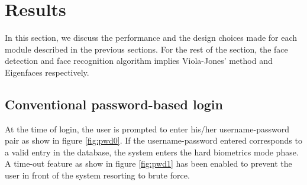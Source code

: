 \documentclass[12pt]{article}			%
\begin{document}
\newpage
\section{ Results }

In this section, we discuss the performance and the design choices made for each module described in the previous sections.
For the rest of the section, the face detection and face recognition algorithm implies Viola-Jones' method and Eigenfaces respectively.

\subsection{Conventional password-based login}
\begin{figure}
	\centering
	\quad
\end{figure}

At the time of login, the user is prompted to enter his/her username-password pair as show  in figure \ref{fig:pwd0}.
If the username-password entered corresponds to a valid entry in the database, the system enters the hard biometrics mode phase.
A time-out feature as show in figure \ref{fig:pwd1} has been enabled to prevent the user in front of the system resorting to brute force. 
\end{document}
